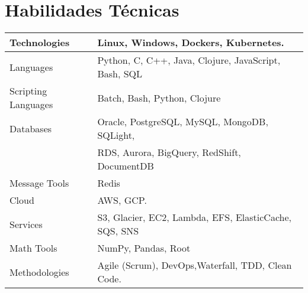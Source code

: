 \section{Habilidades Técnicas}

\begin{center}
  \begin{tabular}{|| l | l ||}
      \hline
      Technologies & Linux, Windows, Dockers, Kubernetes. \\
      \hline
      Languages & Python, C, C++, Java, Clojure, JavaScript, Bash, SQL \\
    \hline
      Scripting Languages \hspace{1mm} & Batch, Bash, Python, Clojure \\
    \hline
      Databases & Oracle, PostgreSQL, MySQL, MongoDB, SQLight, \\ & RDS, Aurora, BigQuery, RedShift, DocumentDB \\
    \hline
      Message Tools & Redis  \\
    \hline
      Cloud & AWS, GCP.  \\
    \hline
      Services & S3, Glacier, EC2, Lambda, EFS, ElasticCache, SQS, SNS \hspace{1mm} \\
    \hline
      Math Tools & NumPy, Pandas, Root \\
    \hline
      Methodologies & Agile (Scrum), DevOps,Waterfall, TDD, Clean Code. \\
    \hline
  \end{tabular}
\end{center}

